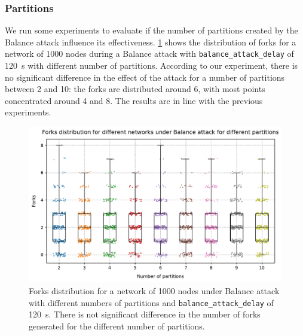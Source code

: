 \clearpage

\subsubsection{Partitions}
We run some experiments to evaluate if the number of partitions created by the Balance attack influence its effectiveness.
\cref{fig:forks-attack-partitions} shows the distribution of forks for a network of \num{1000} nodes during a Balance attack with \texttt{balance\_attack\_delay} of \SI{120}{\second} with different number of partitions.
According to our experiment, there is no significant difference in the effect of the attack for a number of partitions between \num{2} and \num{10}:
the forks are distributed around \num{6}, with most points concentrated around \num{4} and \num{8}.
The results are in line with the previous experiments.

\begin{figure}[t]
	\centering
	\vspace*{0.25cm}
	\includegraphics[width=\myplotswitdth \columnwidth]{plots/forks_attack_partitions_boxplot}
	\caption[Forks distribution for a network of 1000 nodes under Balance attack with different numbers of partitions]{
		Forks distribution for a network of 1000 nodes under Balance attack with different numbers of partitions and \texttt{balance\_attack\_delay} of \SI{120}{s}.
		There is not significant difference in the number of forks generated for the different number of partitions.
	}
	\label{fig:forks-attack-partitions}
\end{figure}


